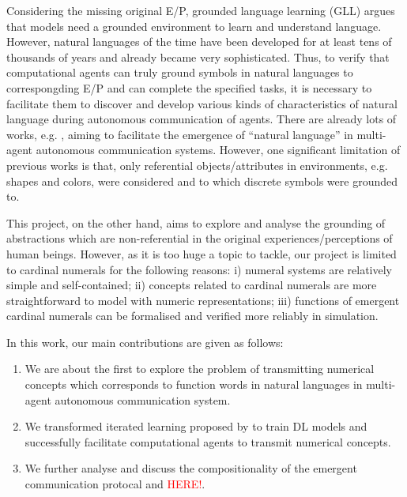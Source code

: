 \documentclass[msc,deptreport]{infthesis} %
\begin{document}
Considering the missing original E/P, grounded language learning (GLL) argues that models need a grounded environment to learn and understand language\cite{matuszek2018grounded}. However, natural languages of the time have been developed for at least tens of thousands of years\cite{berwick2016only} and already became very sophisticated. Thus, to verify that computational agents can truly ground symbols in natural languages to correspongding E/P and can complete the specified tasks, it is necessary to facilitate them to discover and develop various kinds of characteristics of natural language during autonomous communication of agents. There are already lots of works, e.g. \cite{hill2017understanding, havrylov2017emergence, yu2018interactive, kottur2017natural}, aiming to facilitate the emergence of ``natural language'' in multi-agent autonomous communication systems. However, one significant limitation of previous works is that, only referential objects/attributes in environments, e.g. shapes and colors, were considered and to which discrete symbols were grounded to.

This project, on the other hand, aims to explore and analyse the grounding of abstractions which are non-referential in the original experiences/perceptions of human beings. However, as it is too huge a topic to tackle, our project is limited to cardinal numerals for the following reasons: i) numeral systems are relatively simple and self-contained\cite{james1999numeral}; ii) concepts related to cardinal numerals are more straightforward to model with numeric representations; iii) functions of emergent cardinal numerals can be formalised and verified more reliably in simulation.

In this work, our main contributions are given as follows:

\begin{enumerate}
  \item We are about the first to explore the problem of transmitting numerical concepts which corresponds to function words in natural languages in multi-agent autonomous communication system.
  \item We transformed iterated learning proposed by \cite{smith2003iterated} to train DL models and successfully facilitate computational agents to transmit numerical concepts.
  \item We further analyse and discuss the compositionality of the emergent communication protocal and \textcolor{red}{HERE!}.
\end{enumerate}
\end{document}
